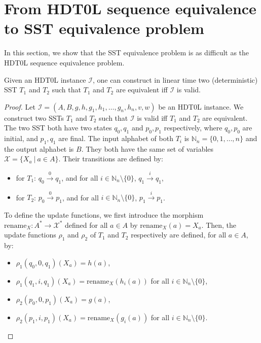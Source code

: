 \documentclass{llncs}
\newcommand{\Vars}{\mathcal{X}}
\begin{document}
\section{From HDT0L sequence equivalence to SST equivalence problem}

In this section, we show that the SST equivalence problem is as
difficult as the HDT0L sequence equivalence problem.  

\begin{lemma}
    Given an HDT0L instance $\mathcal{I}$, one can construct in
    linear time two (deterministic) SST $T_1$ and $T_2$ such that $T_1$ and $T_2$ are
    equivalent iff $\mathcal{I}$ is valid. 
\end{lemma}

\begin{proof}
Let $\mathcal{I} = (A,B, g,h,g_1,h_1,\dots,g_n,h_n,v,w)$ be an HDT0L instance. 
We construct two SSTs $T_1$ and $T_2$ such that $\mathcal{I}$ is valid
iff $T_1$ and $T_2$ are equivalent. The two SST both have two states $q_0,q_1$ and
$p_0,p_1$ respectively, where $q_0,p_0$ are initial, and $p_1,q_1$ are
final. The input alphabet of both $T_i$ is $\mathbb{N}_n = \{0,1,\dots,n\}$ and the
output alphabet is $B$. They both have the same set of variables
$\Vars = \{ X_a\ |\ a\in A\}$. Their transitions are defined by:

\begin{itemize}

  \item for $T_1$: $q_0\xrightarrow{0} q_1$, and for all
    $i\in\mathbb{N}_n\setminus \{0\}$, $q_1\xrightarrow{i} q_1$,
  \item for $T_2$: $p_0\xrightarrow{0} p_1$, and for all $i\in\mathbb{N}_n\setminus \{0\}$, $p_1\xrightarrow{i} p_1$.
\end{itemize}

To define the update functions, we first introduce the morphism
$\text{rename}_X : A^*\rightarrow \Vars^*$ defined for all $a\in A$ by
$\text{rename}_X(a) = X_a$. Then, the update functions $\rho_1$ and $\rho_2$ of $T_1$ and $T_2$
respectively are defined, for all $a\in A$, by:

\begin{itemize}
  \item $\rho_1(q_0,0,q_1)(X_a) = h(a)$,
  \item $\rho_1(q_1,i,q_1)(X_a) = \text{rename}_X(h_i(a))$ for all
    $i\in \mathbb{N}_n\setminus \{0\}$,
  \item $\rho_2(p_0,0,p_1)(X_a) = g(a)$,
  \item $\rho_2(p_1,i,p_1)(X_a) = \text{rename}_X(g_i(a))$ for all
    $i\in \mathbb{N}_n\setminus \{0\}$.
\end{itemize}


\end{proof}
\end{document}

